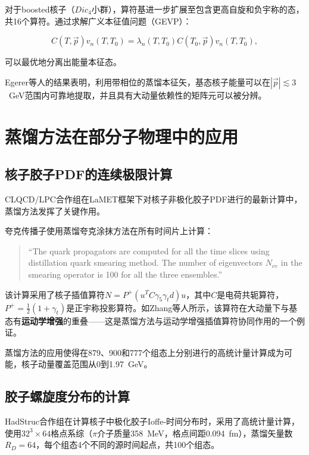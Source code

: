 \documentclass[12pt,a4paper]{ctexart}
\theoremstyle{definition}
\begin{document}
对于boosted核子（$Dic_4$小群），算符基进一步扩展至包含更高自旋和负宇称的态\cite{Egerer2021a}，共16个算符。通过求解广义本征值问题（GEVP）：

\begin{equation}
C(T,\vec{p}) v_n(T, T_0) = \lambda_n(T, T_0) C(T_0,\vec{p}) v_n(T, T_0),
\label{eq:GEVP}
\end{equation}

可以最优地分离出能量本征态\cite{Egerer2021a}。

Egerer等人\cite{Egerer2021a}的结果表明，利用带相位的蒸馏本征矢，基态核子能量可以在$|\vec{p}| \lesssim 3$~GeV范围内可靠地提取，并且具有大动量依赖性的矩阵元可以被分辨。

\section{蒸馏方法在部分子物理中的应用}

\subsection{核子胶子PDF的连续极限计算}

CLQCD/LPC合作组在LaMET框架下对核子非极化胶子PDF进行的最新计算\cite{Chen2025gluon}中，蒸馏方法发挥了关键作用。

夸克传播子使用蒸馏夸克涂抹方法在所有时间片上计算\cite{Chen2025gluon}：

\begin{quote}
``The quark propagators are computed for all the time slices using distillation quark smearing method. The number of eigenvectors $N_{\text{ev}}$ in the smearing operator is 100 for all the three ensembles.''\cite{Chen2025gluon}
\end{quote}

该计算采用了核子插值算符$N = P^+(u^T C\gamma_5\gamma_t d)u$，其中$C$是电荷共轭算符，$P^+ = \frac{1}{2}(1+\gamma_t)$是正宇称投影算符。如Zhang等人\cite{Zhang2025kinematic}所示，该算符在大动量下与基态有\textbf{运动学增强}的重叠——这是蒸馏方法与运动学增强插值算符协同作用的一个例证。

蒸馏方法的应用使得在879、900和777个组态上分别进行的高统计量计算成为可能，核子动量覆盖范围从0到1.97~GeV\cite{Chen2025gluon}。

\subsection{胶子螺旋度分布的计算}

HadStruc合作组在计算核子中极化胶子Ioffe-时间分布时\cite{Egerer2022}，采用了高统计量计算，使用$32^3 \times 64$格点系综（$\pi$介子质量358~MeV，格点间距0.094~fm），蒸馏矢量数$R_D = 64$，每个组态4个不同的源时间起点，共100个组态。
\end{document}
